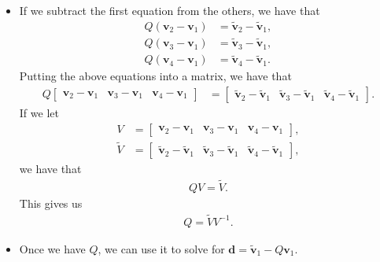 \documentclass[10pt]{article}
\newcommand{\ve}[1]{\mathbf{#1}}
\begin{document}
\begin{itemize}
\begin{itemize}
        \item If we subtract the first equation from the others, we have that
        \begin{align*}
            Q(\ve{v}_2 - \ve{v}_1) &= \widetilde{\ve{v}}_2 - \widetilde{\ve{v}}_1,\\
            Q(\ve{v}_3 - \ve{v}_1) &= \widetilde{\ve{v}}_3 - \widetilde{\ve{v}}_1,\\
            Q(\ve{v}_4 - \ve{v}_1) &= \widetilde{\ve{v}}_4 - \widetilde{\ve{v}}_1.
        \end{align*}
        Putting the above equations into a matrix, we have that
        \begin{align*}
            Q \begin{bmatrix}
                \ve{v}_2 - \ve{v}_1 &
                \ve{v}_3 - \ve{v}_1 &
                \ve{v}_4 - \ve{v}_1
            \end{bmatrix} 
            &= \begin{bmatrix}
                \widetilde{\ve{v}}_2 - \widetilde{\ve{v}}_1 &
                \widetilde{\ve{v}}_3 - \widetilde{\ve{v}}_1 &
                \widetilde{\ve{v}}_4 - \widetilde{\ve{v}}_1
            \end{bmatrix}.
        \end{align*}
        If we let
        \begin{align*}
            V &= \begin{bmatrix}
                \ve{v}_2 - \ve{v}_1 &
                \ve{v}_3 - \ve{v}_1 &
                \ve{v}_4 - \ve{v}_1
            \end{bmatrix}, \\
            \widetilde{V} &= \begin{bmatrix}
                \widetilde{\ve{v}}_2 - \widetilde{\ve{v}}_1 &
                \widetilde{\ve{v}}_3 - \widetilde{\ve{v}}_1 &
                \widetilde{\ve{v}}_4 - \widetilde{\ve{v}}_1
            \end{bmatrix},
        \end{align*}
        we have that
        \begin{align*}
            QV = \widetilde{V}.
        \end{align*}
        This gives us
        \begin{align*}
            Q = \widetilde{V} V^{-1}.
        \end{align*}
        
        \item Once we have $Q$, we can use it to solve for $\ve{d} = \widetilde{\ve{v}}_1 - Q\ve{v}_1$.
        

\end{itemize}
\end{itemize}
\end{document}
